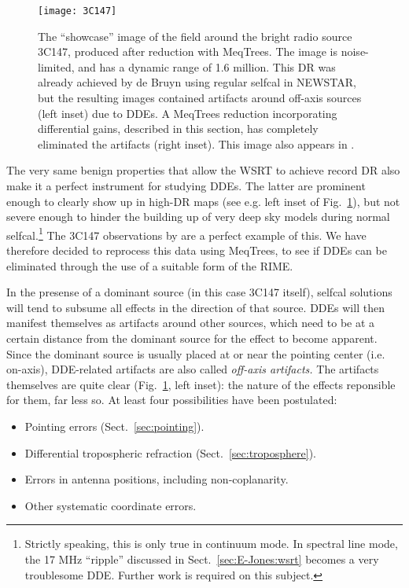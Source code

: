 \documentclass[]{aa}
\begin{document}
\begin{figure}
\sidecaption
\centering
\texttt{[image: 3C147]}
\caption{\label{fig:3C147}The ``showcase'' image of the field around the bright radio source 3C147, produced after reduction with MeqTrees. The image is noise-limited, and has a dynamic range of 1.6 million. This DR was already achieved by de Bruyn using regular selfcal in NEWSTAR, but the resulting images contained artifacts around off-axis sources (left inset) due to DDEs. A MeqTrees reduction incorporating differential gains, described in this section, has completely eliminated the artifacts (right inset). This image also appears in \citet{meqtrees}.}
\end{figure}


The very same benign properties that allow the WSRT to achieve record DR also make it a perfect instrument for studying DDEs. The latter are prominent enough to clearly show up in high-DR maps (see e.g. left inset of Fig.~\ref{fig:3C147}), but not severe enough to hinder the building up of very deep sky models during normal selfcal.\footnote{Strictly speaking, this is only true in continuum mode. In spectral line mode, the 17 MHz ``ripple'' discussed in Sect.~\ref{sec:E-Jones:wsrt} becomes a very troublesome DDE. Further work is required on this subject.} The 3C147 observations by \citet{deBruyn:3C147} are a perfect example of this. We have therefore decided to reprocess this data using MeqTrees, to see if DDEs can be eliminated through the use of a suitable form of the RIME.

In the presense of a dominant source (in this case 3C147 itself), selfcal solutions will tend to subsume all effects in the direction of that source. DDEs will then manifest themselves as artifacts around other sources, which need to be at a certain distance from the dominant source for the effect to become apparent. Since the dominant source is usually placed at or near the pointing center (i.e. on-axis), DDE-related artifacts are also called {\em off-axis artifacts.} The artifacts themselves are quite clear (Fig.~\ref{fig:3C147}, left inset): the nature of the effects reponsible for them, far less so. At least four possibilities have been postulated:

\begin{itemize}
\item Pointing errors (Sect.~\ref{sec:pointing}).
\item Differential tropospheric refraction (Sect.~\ref{sec:troposphere}).
\item Errors in antenna positions, including non-coplanarity.
\item Other systematic coordinate errors.
\end{itemize}
\end{document}
